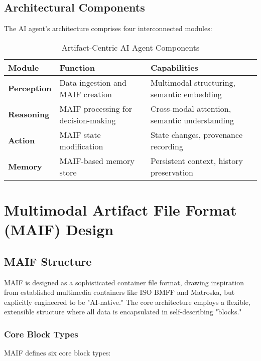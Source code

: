 \documentclass[conference]{IEEEtran}
\begin{document}
\subsection{Architectural Components}

The AI agent's architecture comprises four interconnected modules:

\begin{table}[!t]
\renewcommand{\arraystretch}{1.3}
\caption{Artifact-Centric AI Agent Components}
\label{tab:agent-components}
\centering
\footnotesize
\begin{tabular}{p{2cm}p{3cm}p{3cm}}
\toprule
\textbf{Module} & \textbf{Function} & \textbf{Capabilities} \\
\midrule
\textbf{Perception} & Data ingestion and MAIF creation & Multimodal structuring, semantic embedding \\
\textbf{Reasoning} & MAIF processing for decision-making & Cross-modal attention, semantic understanding \\
\textbf{Action} & MAIF state modification & State changes, provenance recording \\
\textbf{Memory} & MAIF-based memory store & Persistent context, history preservation \\
\bottomrule
\end{tabular}
\end{table}

\section{Multimodal Artifact File Format (MAIF) Design}

\subsection{MAIF Structure}

MAIF is designed as a sophisticated container file format, drawing inspiration from established multimedia containers like ISO BMFF and Matroska, but explicitly engineered to be "AI-native." The core architecture employs a flexible, extensible structure where all data is encapsulated in self-describing "blocks."

\subsubsection{Core Block Types}

MAIF defines six core block types:
\end{document}
